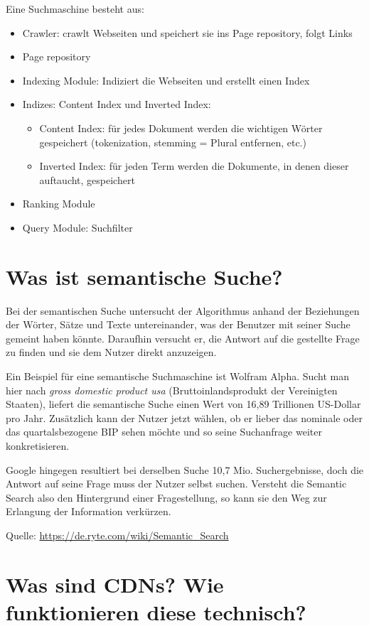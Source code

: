 \documentclass{article}
\begin{document}
	Eine Suchmaschine besteht aus:
	\begin{itemize}
		\item Crawler: crawlt Webseiten und speichert sie ins Page repository, folgt Links
		\item Page repository
		\item Indexing Module: Indiziert die Webseiten und erstellt einen Index
		\item Indizes: Content Index und Inverted Index:
		\begin{itemize}
			\item Content Index: für jedes Dokument werden die wichtigen Wörter gespeichert (tokenization, stemming = Plural entfernen, etc.)
			\item Inverted Index: für jeden Term werden die Dokumente, in denen dieser auftaucht, gespeichert
		\end{itemize}
		\item Ranking Module
		\item Query Module: Suchfilter
	\end{itemize}
	
	\section*{Was ist semantische Suche?}
	
	Bei der semantischen Suche untersucht der Algorithmus anhand der Beziehungen der Wörter, Sätze und Texte untereinander, was der Benutzer mit seiner Suche gemeint haben könnte. Daraufhin versucht er, die Antwort auf die gestellte Frage zu finden und sie dem Nutzer direkt anzuzeigen.
	
	Ein Beispiel für eine semantische Suchmaschine ist Wolfram Alpha. Sucht man hier nach \textit{gross domestic product usa} (Bruttoinlandsprodukt der Vereinigten Staaten), liefert die semantische Suche einen Wert von 16,89 Trillionen US-Dollar pro Jahr. Zusätzlich kann der Nutzer jetzt wählen, ob er lieber das nominale oder das quartalsbezogene BIP sehen möchte und so seine Suchanfrage weiter konkretisieren.
	
	Google hingegen resultiert bei derselben Suche 10,7 Mio. Suchergebnisse, doch die Antwort auf seine Frage muss der Nutzer selbst suchen. Versteht die Semantic Search also den Hintergrund einer Fragestellung, so kann sie den Weg zur Erlangung der Information verkürzen.
	
	Quelle: \url{https://de.ryte.com/wiki/Semantic_Search}
	
	\section*{Was sind CDNs? Wie funktionieren diese technisch?}
	
\end{document}
